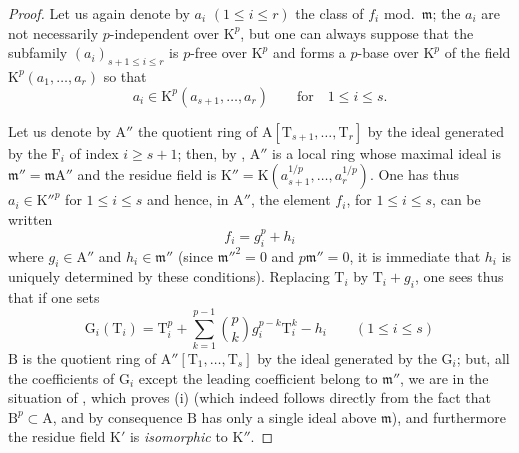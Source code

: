 \begin{proof}
Let us again denote by $a_i$ $(1\leq i\leq r)$ the class of $f_i$ mod.~$\mathfrak{m}$; the $a_i$ are not necessarily $p$-independent over $\mathrm{K}^p$, but one can always suppose that the subfamily
$(a_i)_{s+1\leq i\leq r}$ is $p$-free over $\mathrm{K}^p$ and forms a $p$-base over $\mathrm{K}^p$ of the field $\mathrm{K}^p(a_1,\ldots,a_r)$ so that
\[
  a_i\in\mathrm{K}^p(a_{s+1},\ldots,a_r)\qquad\text{for}\quad 1\leq i\leq s.
\]

Let us denote by $\mathrm{A}''$ the quotient ring of $\mathrm{A}[\mathrm{T}_{s+1},\ldots,\mathrm{T}_r]$ by the ideal generated by the $\mathrm{F}_i$ of index $i\geq s+1$; then, by , $\mathrm{A}''$ is a local ring whose maximal ideal is $\mathfrak{m}''=\mathfrak{m}\mathrm{A}''$ and the residue field is $\mathrm{K}''=\mathrm{K}(a_{s+1}^{1/p},\ldots,a_r^{1/p})$.
One has thus $a_i\in\mathrm{K}''^p$ for $1\leq i\leq s$ and hence, in $\mathrm{A}''$, the element $f_i$, for $1\leq i\leq s$, can be written
\[
\label{0.22.4.7.3}
  f_i=g_i^p+h_i
  \tag{22.4.7.3}
\]
where $g_i\in\mathrm{A}''$ and $h_i\in\mathfrak{m}''$ (since $\mathfrak{m}''^2=0$ and $p\mathfrak{m}''=0$, it is immediate that $h_i$ is uniquely determined by these conditions).
Replacing $\mathrm{T}_i$ by $\mathrm{T}_i+g_i$, one sees thus that if one sets
\[
  \mathrm{G}_i(\mathrm{T}_i)=\mathrm{T}_i^p+\sum_{k=1}^{p-1}\binom{p}{k}g_i^{p-k}\mathrm{T}_i^k-h_i\qquad(1\leq i\leq s)
\]
$\mathrm{B}$ is the quotient ring of $\mathrm{A}''[\mathrm{T}_1,\ldots,\mathrm{T}_s]$ by the ideal generated by the $\mathrm{G}_i$; but, all the coefficients of $\mathrm{G}_i$ except the leading coefficient belong to $\mathfrak{m}''$, we are in the situation of , which proves (i) (which indeed follows directly from the fact that $\mathrm{B}^p\subset\mathrm{A}$, and by consequence $\mathrm{B}$ has only a single ideal above $\mathfrak{m}$), and furthermore the residue field $\mathrm{K}'$ is \emph{isomorphic} to $\mathrm{K}''$.


\end{proof}
